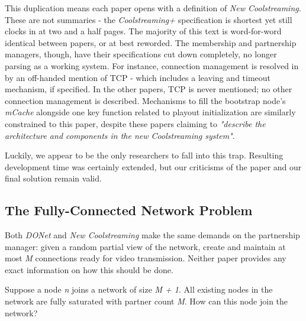 \documentclass[12pt,a4paper]{article}
\begin{document}
This duplication means each paper opens with a definition of \textit{New Coolstreaming}. These are not summaries - the \textit{Coolstreaming+} specification is shortest yet still clocks in at two and a half pages. The majority of this text is word-for-word identical between papers, or at best reworded. The membership and partnership managers, though, have their specifications cut down completely, no longer parsing as a working system. For instance, connection management is resolved in \cite{Xie2007} by an off-handed mention of TCP - which includes a leaving and timeout mechanism, if specified. In the other papers, TCP is never mentioned; no other connection management is described. Mechanisms to fill the bootstrap node's \textit{mCache} alongside one key function related to playout initialization are similarly constrained to this paper, despite these papers claiming to \textit{"describe the architecture and components in the new Coolstreaming system"}.

Luckily, we appear to be the only researchers to fall into this trap. Resulting development time was certainly extended, but our criticisms of the paper and our final solution remain valid.

\subsection{The Fully-Connected Network Problem}
Both \textit{DONet} and \textit{New Coolstreaming} make the same demands on the partnership manager: given a random partial view of the network, create and maintain at most \textit{M} connections ready for video transmission. Neither paper provides any exact information on how this should be done.

Suppose a node \textit{n} joins a network of size \textit{M + 1}. All existing nodes in the network are fully saturated with partner count \textit{M}. How can this node join the network?
\end{document}
